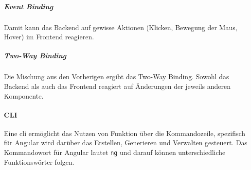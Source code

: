 \subparagraph{Event Binding} Damit kann das Backend auf gewisse Aktionen (Klicken, Bewegung der Maus, Hover) im Frontend reagieren.

\subparagraph{Two-Way Binding} Die Mischung aus den Vorherigen ergibt das Two-Way Binding. Sowohl das Backend als auch das Frontend reagiert auf Änderungen der jeweils anderen Komponente.

\paragraph{CLI}

Eine \gls{cli} ermöglicht das Nutzen von Funktion über die Kommandozeile, spezifisch für Angular wird darüber das Erstellen, Generieren und Verwalten gesteuert. Das Kommandowort für Angular lautet \lstinline{ng} und darauf können unterschiedliche Funktionswörter folgen.